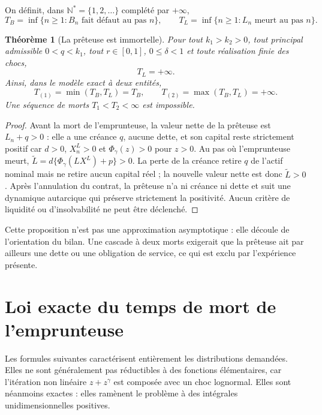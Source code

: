 \documentclass[11pt,a4paper]{article}
\newcommand{\1}{\mathbf 1}
\newtheorem{theorem}{Théorème}[section]
\theoremstyle{definition}
\theoremstyle{remark}
\begin{document}
On définit, dans $\mathbb N^*=\{1,2,\ldots\}$ complété par $+\infty$,
\begin{equation}
T_B=\inf\{n\geq1:B_n\text{ fait défaut au pas }n\},
\qquad
T_L=\inf\{n\geq1:L_n\text{ meurt au pas }n\}.
\label{eq:stopping-times}
\end{equation}

\begin{theorem}[La prêteuse est immortelle]
Pour tout $k_1>k_2>0$, tout principal admissible $0<q<k_1$, tout
$r\in[0,1]$, $0\leq\delta<1$ et toute réalisation finie des chocs,
\begin{equation}
T_L=+\infty.
\label{eq:lender-immortal}
\end{equation}
Ainsi, dans le modèle exact à deux entités,
\[
T_{(1)}=\min(T_B,T_L)=T_B,
\qquad T_{(2)}=\max(T_B,T_L)=+\infty.
\]
Une séquence de morts $T_1<T_2<\infty$ est impossible.
\end{theorem}
\begin{proof}
Avant la mort de l'emprunteuse, la valeur nette de la prêteuse est
$L_n+q>0$ : elle a une créance $q$, aucune dette, et son capital reste
strictement positif car $d>0$, $X^L_n>0$ et
$\Phi_\gamma(z)>0$ pour $z>0$. Au pas où l'emprunteuse meurt,
$\widetilde L=d\{\Phi_\gamma(LX^L)+p\}>0$. La perte de la créance retire
$q$ de l'actif nominal mais ne retire aucun capital réel ; la nouvelle
valeur nette est donc $\widetilde L>0$. Après l'annulation du contrat, la
prêteuse n'a ni créance ni dette et suit une dynamique autarcique qui
préserve strictement la positivité. Aucun critère de liquidité ou
d'insolvabilité ne peut être déclenché.
\end{proof}

Cette proposition n'est pas une approximation asymptotique : elle découle
de l'orientation du bilan. Une cascade à deux morts exigerait que la
prêteuse ait par ailleurs une dette ou une obligation de service, ce qui
est exclu par l'expérience présente.

\section{Loi exacte du temps de mort de l'emprunteuse}

Les formules suivantes caractérisent entièrement les distributions
demandées. Elles ne sont généralement pas réductibles à des fonctions
élémentaires, car l'itération non linéaire $z+z^\gamma$ est composée avec
un choc lognormal. Elles sont néanmoins exactes : elles ramènent le
problème à des intégrales unidimensionnelles positives.
\end{document}
